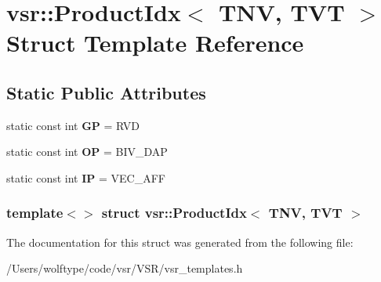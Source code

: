\hypertarget{structvsr_1_1_product_idx_3_01_t_n_v_00_01_t_v_t_01_4}{\section{vsr\-:\-:Product\-Idx$<$ T\-N\-V, T\-V\-T $>$ Struct Template Reference}
\label{structvsr_1_1_product_idx_3_01_t_n_v_00_01_t_v_t_01_4}
}
\subsection*{Static Public Attributes}
\begin{DoxyCompactItemize}
\item 
\hypertarget{structvsr_1_1_product_idx_3_01_t_n_v_00_01_t_v_t_01_4_a32fc7ca815157f4aedbdf953793acb77}{static const int {\bfseries G\-P} = R\-V\-D}\label{structvsr_1_1_product_idx_3_01_t_n_v_00_01_t_v_t_01_4_a32fc7ca815157f4aedbdf953793acb77}

\item 
\hypertarget{structvsr_1_1_product_idx_3_01_t_n_v_00_01_t_v_t_01_4_a30e7dd6dc77d13bd2986e2680b196ae6}{static const int {\bfseries O\-P} = B\-I\-V\-\_\-\-D\-A\-P}\label{structvsr_1_1_product_idx_3_01_t_n_v_00_01_t_v_t_01_4_a30e7dd6dc77d13bd2986e2680b196ae6}

\item 
\hypertarget{structvsr_1_1_product_idx_3_01_t_n_v_00_01_t_v_t_01_4_aa2e3dc956a4d5b86961089a1bcd0d5f3}{static const int {\bfseries I\-P} = V\-E\-C\-\_\-\-A\-F\-F}\label{structvsr_1_1_product_idx_3_01_t_n_v_00_01_t_v_t_01_4_aa2e3dc956a4d5b86961089a1bcd0d5f3}

\end{DoxyCompactItemize}
\subsubsection*{template$<$$>$ struct vsr\-::\-Product\-Idx$<$ T\-N\-V, T\-V\-T $>$}



The documentation for this struct was generated from the following file\-:\begin{DoxyCompactItemize}
\item 
/\-Users/wolftype/code/vsr/\-V\-S\-R/vsr\-\_\-templates.\-h\end{DoxyCompactItemize}
